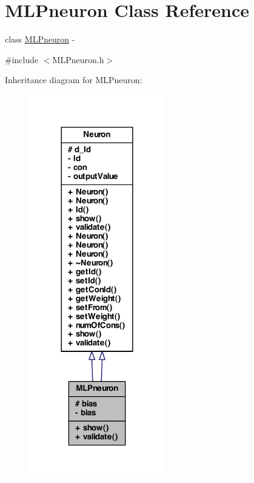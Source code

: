 \hypertarget{class_m_l_pneuron}{
\section{MLPneuron Class Reference}
\label{class_m_l_pneuron}
}


class \hyperlink{class_m_l_pneuron}{MLPneuron} -\/  




{\ttfamily \#include $<$MLPneuron.h$>$}



Inheritance diagram for MLPneuron:
\nopagebreak
\begin{figure}[H]
\begin{center}
\leavevmode
\includegraphics[width=168pt]{class_m_l_pneuron__inherit__graph}
\end{center}
\end{figure}


